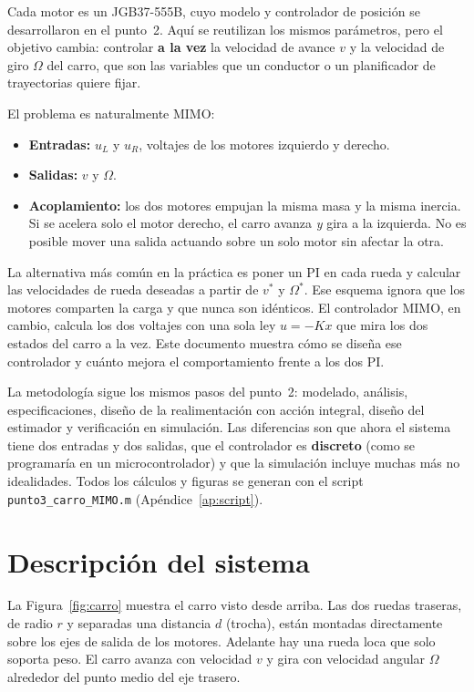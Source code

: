 \documentclass[11pt,letterpaper]{article}
\begin{document}
Cada motor es un JGB37-555B, cuyo modelo y controlador de posición se desarrollaron en el punto~2. Aquí se reutilizan los mismos parámetros, pero el objetivo cambia: controlar \textbf{a la vez} la velocidad de avance $v$ y la velocidad de giro $\Omega$ del carro, que son las variables que un conductor o un planificador de trayectorias quiere fijar.

El problema es naturalmente MIMO:
\begin{itemize}
  \item \textbf{Entradas:} $u_L$ y $u_R$, voltajes de los motores izquierdo y derecho.
  \item \textbf{Salidas:} $v$ y $\Omega$.
  \item \textbf{Acoplamiento:} los dos motores empujan la misma masa y la misma inercia. Si se acelera solo el motor derecho, el carro avanza \emph{y} gira a la izquierda. No es posible mover una salida actuando sobre un solo motor sin afectar la otra.
\end{itemize}

La alternativa más común en la práctica es poner un PI en cada rueda y calcular las velocidades de rueda deseadas a partir de $v^*$ y $\Omega^*$. Ese esquema ignora que los motores comparten la carga y que nunca son idénticos. El controlador MIMO, en cambio, calcula los dos voltajes con una sola ley $u=-Kx$ que mira los dos estados del carro a la vez. Este documento muestra cómo se diseña ese controlador y cuánto mejora el comportamiento frente a los dos PI.

La metodología sigue los mismos pasos del punto~2: modelado, análisis, especificaciones, diseño de la realimentación con acción integral, diseño del estimador y verificación en simulación. Las diferencias son que ahora el sistema tiene dos entradas y dos salidas, que el controlador es \textbf{discreto} (como se programaría en un microcontrolador) y que la simulación incluye muchas más no idealidades. Todos los cálculos y figuras se generan con el script \texttt{punto3\_carro\_MIMO.m} (Apéndice~\ref{ap:script}).

\section{Descripción del sistema}
La Figura~\ref{fig:carro} muestra el carro visto desde arriba. Las dos ruedas traseras, de radio $r$ y separadas una distancia $d$ (trocha), están montadas directamente sobre los ejes de salida de los motores. Adelante hay una rueda loca que solo soporta peso. El carro avanza con velocidad $v$ y gira con velocidad angular $\Omega$ alrededor del punto medio del eje trasero.
\end{document}
